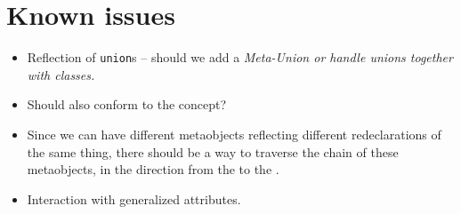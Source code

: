 \section{Known issues}

\begin{itemize}

\item{Reflection of \texttt{union}s -- should we add a \em{Meta-Union} or
handle unions together with classes.}

\item{Should  also conform to the  concept?}

\item{Since we can have different metaobjects reflecting different redeclarations
of the same thing, there should be a way to traverse the chain of these metaobjects,
in the direction from the  to the .}

\item{Interaction with generalized attributes.}

\end{itemize}
